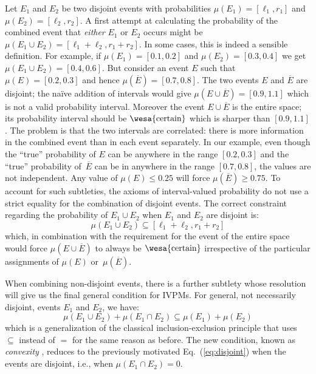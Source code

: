 \documentclass[english,reprint, aps, prl,superscriptaddress, showpacs,
showkeys, longbibliography, amsmath, amssymb, floatfix]{revtex4-1}
\theoremstyle{plain}
\theoremstyle{definition}
\newcommand{\necess}{{\text{\wesa{certain}}}}
\begin{document}
Let $E_1$ and $E_2$ be two disjoint events with probabilities
$\mu(E_1)=[\ell_1,r_1]$ and $\mu(E_2)=[\ell_2,r_2]$. A first attempt
at calculating the probability of the combined event that
\emph{either} $E_1$ or $E_2$ occurs might be
$\mu(E_1\cup E_2) = [\ell_1+\ell_2,r_1+r_2]$. In some cases, this is
indeed a sensible definition. For example, if $\mu(E_1)=[0.1,0.2]$ and
$\mu(E_2)=[0.3,0.4]$ we get $\mu(E_1\cup E_2) = [0.4,0.6]$. But
consider an event $E$ such that $\mu(E)=[0.2,0.3]$ and hence
$\mu(\overline{E})=[0.7,0.8]$. The two events $E$ and $\overline{E}$
are disjoint; the naïve addition of intervals would give
$\mu(E\cup\overline{E})=[0.9,1.1]$ which is not a valid probability
interval. Moreover the event $E\cup\overline{E}$ is the
entire space; its probability interval should be
$\necess$ which is sharper than $[0.9,1.1]$. The problem is that the
two intervals are correlated: there is more information in the
combined event than in each event separately. In our example, even
though the ``true'' probability of $E$ can be anywhere in the range
$[0.2,0.3]$ and the ``true'' probability of~$\overline{E}$ can be in
anywhere in the range $[0.7,0.8]$, the values are not independent. Any
value of $\mu(E) \leq 0.25$ will force $\mu(\overline{E})\geq
0.75$. To account for such subtleties, the axioms of interval-valued
probability do not use a strict equality for the combination of
disjoint events. The correct constraint regarding the probability of
$E_1\cup E_2$ when $E_1$ and $E_2$ are disjoint is:
\begin{equation}
\label{eq:disjoint}
\mu(E_1\cup E_2) \subseteq [\ell_1+\ell_2,r_1+r_2]
\end{equation}
which, in combination with the requirement for the event of the entire
space would force $\mu(E \cup \overline{E})$ to always be $\necess$
irrespective of the particular assignments of $\mu(E)$
or~$\mu(\overline{E})$.

When combining non-disjoint events, there is a further subtlety whose
resolution will give us the final general condition for IVPMs. For
general, not necessarily disjoint, events $E_1$ and $E_2$, we have:
\begin{equation}
\mu(E_1\cup E_2) + \mu(E_1\cap E_2) \subseteq \mu(E_1) + \mu(E_2)
\label{eq:classicalconvex}
\end{equation}
which is a generalization of the classical inclusion-exclusion
principle that uses $\subseteq$ instead of $=$ for the same reason as
before. The new condition, known as \emph{convexity}
\cite{Shapley1971,GilboaSchmeidler1994,NgMoYeh1997,Marinacci1999,MarinacciMontrucchio2005,Grabisch2016},
reduces to the previously motivated Eq.~(\ref{eq:disjoint}) when the
events are disjoint, i.e., when $\mu(E_1\cap E_2) = 0$.
\end{document}
